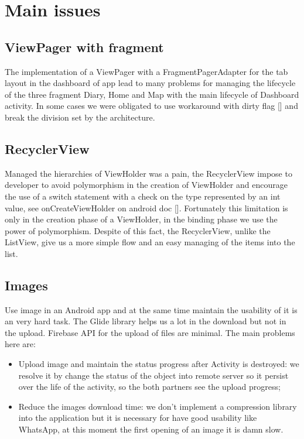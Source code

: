 
\section{Main issues}

\subsection{ViewPager with fragment}
The implementation of a ViewPager with a FragmentPagerAdapter for the tab layout in the dashboard of app lead to many problems for managing the lifecycle of the three fragment Diary, Home and Map with the main lifecycle of Dashboard activity.
In some cases we were obligated to use workaround with dirty flag [] and break the division set by the architecture.

\subsection{RecyclerView}
Managed the hierarchies of ViewHolder was a pain, the RecyclerView impose to developer to avoid polymorphism in the creation of ViewHolder and encourage the use of a switch statement with a check on the type represented by an int value, see onCreateViewHolder on android doc []. Fortunately this limitation is only in the creation phase of a ViewHolder, in the binding phase we use the power of polymorphism. Despite of this fact, the RecyclerView, unlike the ListView, give us a more simple flow and an easy managing of the items into the list.

\subsection{Images}
Use image in an Android app and at the same time maintain the usability of it is an very hard task. The Glide library helps us a lot in the download but not in the upload. Firebase API for the upload of files are minimal. The main problems here are:
\begin{itemize}
	\item Upload image and maintain the status progress after Activity is destroyed: we resolve it by change the status of the object into remote server so it persist over the life of the activity, so the both partners see the upload progress;
	\item Reduce the images download time: we don’t implement a compression library into the application but it is necessary for have good usability like WhatsApp, at this moment the first opening of an image it is damn slow.
\end{itemize}

